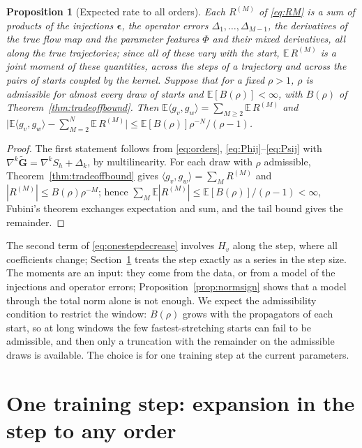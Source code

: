 \documentclass[11pt]{article}
\newtheorem{proposition}{Proposition}
\theoremstyle{definition}
\theoremstyle{remark}
\newcommand{\Gt}{\tilde{\mathbf{G}}}
\newcommand{\eps}{\bm{\epsilon}}
\begin{document}
\begin{proposition}[Expected rate to all orders]\label{prop:expectedrate}
Each $R^{(M)}$ of \eqref{eq:RM} is a sum of products of the injections $\eps$, the operator errors $\Delta_1,\dots,\Delta_{M-1}$, the derivatives of the true flow map and the parameter features $\Phi$ and their mixed derivatives, all along the true trajectories; since all of these vary with the start, $\mathbb E\,R^{(M)}$ is a joint moment of these quantities, across the steps of a trajectory and across the pairs of starts coupled by the kernel.
Suppose that for a fixed $\rho>1$, $\rho$ is admissible for almost every draw of starts and $\mathbb E[B(\rho)]<\infty$, with $B(\rho)$ of Theorem~\ref{thm:tradeoffbound}.
Then $\mathbb E\langle g_v,g_w\rangle=\sum_{M\ge2}\mathbb E\,R^{(M)}$ and $\big|\mathbb E\langle g_v,g_w\rangle-\sum_{M=2}^N\mathbb E\,R^{(M)}\big|\le\mathbb E[B(\rho)]\rho^{-N}/(\rho-1)$.
\end{proposition}

\begin{proof}
The first statement follows from \eqref{eq:orders}, \eqref{eq:Phij}--\eqref{eq:Psij} with $\nabla^k\Gt=\nabla^kS_h+\Delta_k$, by multilinearity.
For each draw with $\rho$ admissible, Theorem~\ref{thm:tradeoffbound} gives $\langle g_v,g_w\rangle=\sum_MR^{(M)}$ and $|R^{(M)}|\le B(\rho)\rho^{-M}$; hence $\sum_M\mathbb E|R^{(M)}|\le\mathbb E[B(\rho)]/(\rho-1)<\infty$, Fubini's theorem exchanges expectation and sum, and the tail bound gives the remainder.
\end{proof}

The second term of \eqref{eq:onestepdecrease} involves $H_v$ along the step, where all coefficients change; Section~\ref{sec:stepseries} treats the step exactly as a series in the step size.
The moments are an input: they come from the data, or from a model of the injections and operator errors; Proposition~\ref{prop:normsign} shows that a model through the total norm alone is not enough.
We expect the admissibility condition to restrict the window: $B(\rho)$ grows with the propagators of each start, so at long windows the few fastest-stretching starts can fail to be admissible, and then only a truncation with the remainder on the admissible draws is available.
The choice is for one training step at the current parameters.

\section{One training step: expansion in the step to any order}\label{sec:stepseries}
\end{document}
